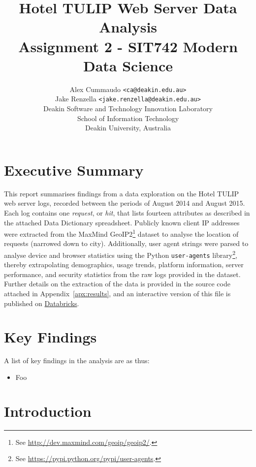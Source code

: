 \documentclass[12pt,titlepage]{article}
\author{Alex Cummaudo \texttt{<ca@deakin.edu.au>}\\ Jake Renzella \texttt{<jake.renzella@deakin.edu.au>}\\
Deakin Software and Technology Innovation Laboratory\\School of Information Technology\\Deakin University, Australia}
\title{Hotel TULIP Web Server Data Analysis\\\normalsize{\bfseries Assignment 2 - SIT742 Modern Data Science}}
\begin{document}
\maketitle

\section*{Executive Summary}

This report summarises findings from a data exploration on the Hotel TULIP web server logs, recorded between the periods of August 2014 and August 2015. Each log contains one \textit{request}, or \textit{hit}, that lists fourteen attributes as described in the attached Data Dictionary spreadsheet. Publicly known client IP addresses were extracted from the MaxMind GeoIP2\footnote{See \url{http://dev.maxmind.com/geoip/geoip2/}.} dataset to analyse the location of requests (narrowed down to city). Additionally, user agent strings were parsed to analyse device and browser statistics using the Python \texttt{user-agents} library\footnote{See \url{https://pypi.python.org/pypi/user-agents}.}, thereby extrapolating demographics, usage trends, platform information, server performance, and security statistics from the raw logs provided in the dataset. Further details on the extraction of the data is provided in the source code attached in Appendix~\ref{apx:results}, and an interactive version of this file is published on \href{https://databricks-prod-cloudfront.cloud.databricks.com/public/4027ec902e239c93eaaa8714f173bcfc/7364378259770565/3552971541306612/8155742302574378/latest.html}{Databricks}.

\newpage

\tableofcontents\newpage
\listoffigures\newpage
\listoftables\newpage

\newpage
\section{Key Findings}

A list of key findings in the analysis are as thus:

\begin{itemize}
  \item Foo
\end{itemize}

\newpage
\section{Introduction}
\end{document}
